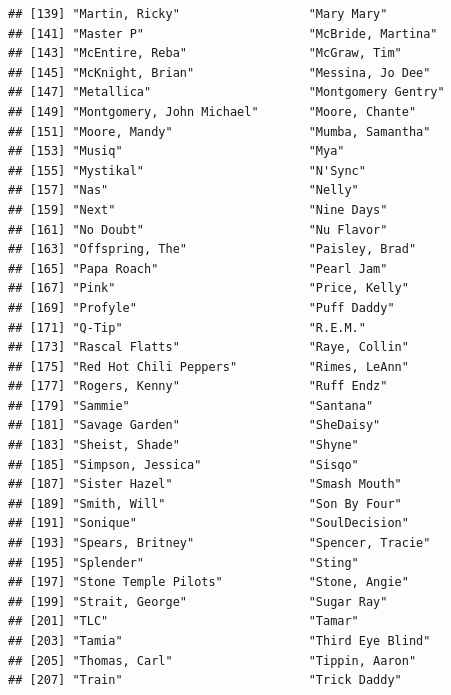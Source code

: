 \documentclass[
  11pt]{report}
\begin{document}
\begin{itemize}
\begin{verbatim}
## [139] "Martin, Ricky"                  "Mary Mary"                     
## [141] "Master P"                       "McBride, Martina"              
## [143] "McEntire, Reba"                 "McGraw, Tim"                   
## [145] "McKnight, Brian"                "Messina, Jo Dee"               
## [147] "Metallica"                      "Montgomery Gentry"             
## [149] "Montgomery, John Michael"       "Moore, Chante"                 
## [151] "Moore, Mandy"                   "Mumba, Samantha"               
## [153] "Musiq"                          "Mya"                           
## [155] "Mystikal"                       "N'Sync"                        
## [157] "Nas"                            "Nelly"                         
## [159] "Next"                           "Nine Days"                     
## [161] "No Doubt"                       "Nu Flavor"                     
## [163] "Offspring, The"                 "Paisley, Brad"                 
## [165] "Papa Roach"                     "Pearl Jam"                     
## [167] "Pink"                           "Price, Kelly"                  
## [169] "Profyle"                        "Puff Daddy"                    
## [171] "Q-Tip"                          "R.E.M."                        
## [173] "Rascal Flatts"                  "Raye, Collin"                  
## [175] "Red Hot Chili Peppers"          "Rimes, LeAnn"                  
## [177] "Rogers, Kenny"                  "Ruff Endz"                     
## [179] "Sammie"                         "Santana"                       
## [181] "Savage Garden"                  "SheDaisy"                      
## [183] "Sheist, Shade"                  "Shyne"                         
## [185] "Simpson, Jessica"               "Sisqo"                         
## [187] "Sister Hazel"                   "Smash Mouth"                   
## [189] "Smith, Will"                    "Son By Four"                   
## [191] "Sonique"                        "SoulDecision"                  
## [193] "Spears, Britney"                "Spencer, Tracie"               
## [195] "Splender"                       "Sting"                         
## [197] "Stone Temple Pilots"            "Stone, Angie"                  
## [199] "Strait, George"                 "Sugar Ray"                     
## [201] "TLC"                            "Tamar"                         
## [203] "Tamia"                          "Third Eye Blind"               
## [205] "Thomas, Carl"                   "Tippin, Aaron"                 
## [207] "Train"                          "Trick Daddy"                   

\end{verbatim}
\end{itemize}
\end{document}
